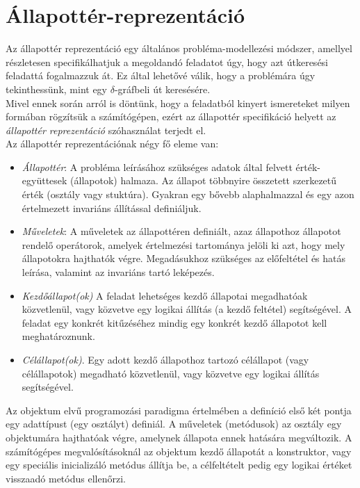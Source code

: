 \documentclass[12pt,margin=0px]{article}
\begin{document}
	\section*{Állapottér-reprezentáció}

    \noindent Az állapottér reprezentáció egy általános probléma-modellezési módszer, amellyel részletesen specifikálhatjuk a megoldandó feladatot úgy, hogy azt útkeresési feladattá fogalmazzuk át. Ez által lehetővé válik, hogy a problémára úgy tekinthessünk, mint egy $\delta$-gráfbeli út keresésére.\\
    {\small \color{mygray}Mivel ennek során arról is döntünk, hogy a feladatból kinyert ismereteket milyen formában rögzítsük a számítógépen, ezért az állapottér specifikáció helyett az \emph{állapottér reprezentáció} szóhasználat terjedt el.}\\

    \noindent Az állapottér reprezentációnak négy fő eleme van:
	\begin{itemize}
	   \item \textit{Állapottér}: A probléma leírásához szükséges adatok által felvett érték-együttesek (állapotok) halmaza. Az állapot többnyire összetett szerkezetű érték (osztály vagy stuktúra). Gyakran egy bővebb alaphalmazzal és egy azon értelmezett invariáns állítással definiáljuk.
		\item \textit{Műveletek}: A műveletek az állapottéren definiált, azaz állapothoz állapotot rendelő operátorok, amelyek értelmezési tartománya jelöli ki azt, hogy mely állapotokra hajthatók végre. Megadásukhoz szükséges az előfeltétel és hatás leírása, valamint az invariáns tartó leképezés.
		\item \textit{Kezdőállapot(ok)} A feladat lehetséges kezdő állapotai megadhatóak közvetlenül, vagy közvetve egy logikai állítás (a kezdő feltétel) segítségével. A feladat egy konkrét kitűzéséhez mindig egy konkrét kezdő állapotot kell meghatároznunk.
		\item \textit{Célállapot(ok)}. Egy adott kezdő állapothoz tartozó célállapot (vagy célállapotok) megadható közvetlenül, vagy közvetve egy logikai állítás segítségével.
	\end{itemize}

    {\footnotesize \noindent {\color{blue} \faLightbulbO\ $\triangleright$ }

    \noindent Az objektum elvű programozási paradigma értelmében a definíció első két pontja egy adattípust (egy osztályt) definiál. A műveletek (metódusok) az osztály egy objektumára hajthatóak végre, amelynek állapota ennek hatására megváltozik. A számítógépes megvalósításoknál az objektum kezdő állapotát a konstruktor, vagy egy speciális inicializáló metódus állítja be, a célfeltételt pedig egy logikai értéket visszaadó metódus ellenőrzi.}\\
\end{document}
